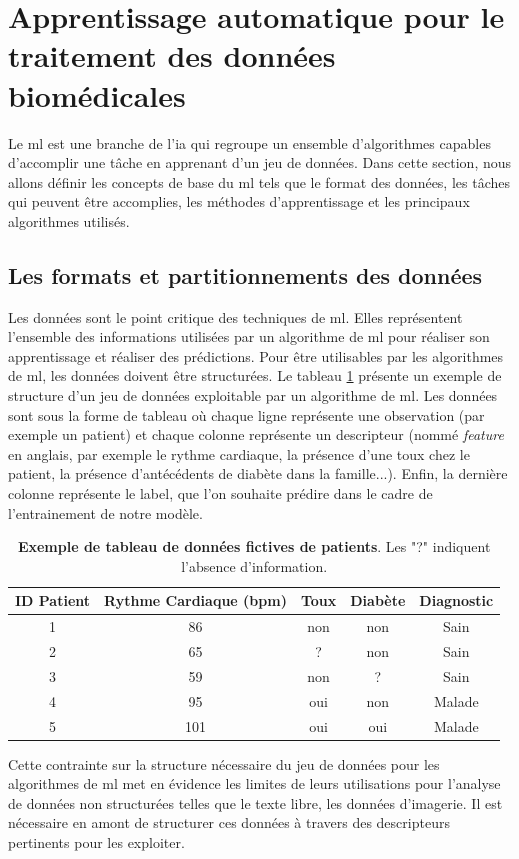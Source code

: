 \section{Apprentissage automatique pour le traitement des données biomédicales}
Le \gls{ml} est une branche de l'\gls{ia} qui regroupe un ensemble d'algorithmes capables d'accomplir une tâche en apprenant d'un jeu de données. Dans cette section, nous allons définir les concepts de base du \gls{ml} tels que le format des données, les tâches qui peuvent être accomplies, les méthodes d'apprentissage et les principaux algorithmes utilisés.

\subsection{Les formats et partitionnements des données}
Les données sont le point critique des techniques de \gls{ml}. Elles représentent l'ensemble des informations utilisées par un algorithme de \gls{ml} pour réaliser son apprentissage et réaliser des prédictions. Pour être utilisables par les algorithmes de \gls{ml}, les données doivent être structurées. Le tableau \ref{table:dataset_intro} présente un exemple de structure d'un jeu de données exploitable par un algorithme de \gls{ml}. Les données sont sous la forme de tableau où chaque ligne représente une observation (par exemple un patient) et chaque colonne représente un descripteur (nommé \textit{feature} en anglais, par exemple le rythme cardiaque, la présence d'une toux chez le patient, la présence d'antécédents de diabète dans la famille...). Enfin, la dernière colonne représente le label, que l'on souhaite prédire dans le cadre de l'entrainement de notre modèle.
\begin{table}[!htbp]
\centering
\begin{tabular}{|c|c|c|c|c|} 
 \hline
 ID Patient & Rythme Cardiaque (bpm) & Toux & Diabète & Diagnostic \\
 \hline
 1 & 86 & non & non & Sain \\ 
 2 & 65 & ? & non & Sain \\ 
 3 & 59 & non & ? & Sain \\ 
 4 & 95 & oui & non & Malade \\ 
 5 & 101 & oui & oui & Malade\\ 
 \hline
\end{tabular}
\caption[Exemple de tableau de données fictives de patients]{\textbf{Exemple de tableau de données fictives de patients}. Les "?" indiquent l'absence d'information.}
\label{table:dataset_intro}
\end{table}
Cette contrainte sur la structure nécessaire du jeu de données pour les algorithmes de \gls{ml} met en évidence les limites de leurs utilisations pour l'analyse de données non structurées telles que le texte libre, les données d'imagerie. Il est nécessaire en amont de structurer ces données à travers des descripteurs pertinents pour les exploiter.

